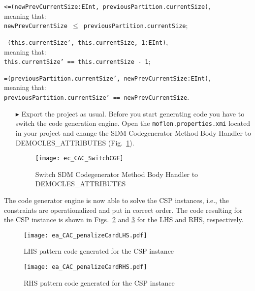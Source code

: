 \hspace*{0.5cm}\texttt{\small<=(newPrevCurrentSize:EInt, previousPartition.currentSize)},\\
meaning that:\\
\hspace*{0.5cm} \texttt{\small newPrevCurrentSize $\leq$ previousPartition.currentSize};

\hspace*{0.5cm}\texttt{\small-(this.currentSize', this.currentSize, 1:EInt)},\\
meaning that:\\
\hspace*{0.5cm} \texttt{\small this.currentSize' == this.currentSize - 1};

\hspace*{0.5cm}\texttt{\small=(previousPartition.currentSize', newPrevCurrentSize:EInt)},\\
meaning that:\\
\hspace*{0.5cm} \texttt{\small previousPartition.currentSize' == newPrevCurrentSize}.
\begin{itemize}    
\item[$\blacktriangleright$] Export the project as usual. Before you start generating code you have to switch the code generation engine. Open the \texttt{moflon.properties.xmi} located in your project and change the \textsf{SDM Codegenerator Method Body Handler} to  \textsf{DEMOCLES\_ATTRIBUTES} (Fig.~\ref{ec_CAC_SwitchCGE}).

\begin{figure}[htbp]
\begin{center}
  \texttt{[image: ec\_CAC\_SwitchCGE]}
  \caption{Switch \textsf{SDM Codegenerator Method Body Handler} to \textsf{DEMOCLES\_ATTRIBUTES}}  
  \label{ec_CAC_SwitchCGE}
\end{center}
\end{figure}

\end{itemize}
The code generator engine is now able to solve the CSP instances, i.e., the constraints are operationalized and put in correct order. 
The code resulting for the CSP instance is shown in Figs.~\ref{ea_CAC_penalizeCardLHS} and \ref{ea_CAC_penalizeCardRHS} for the LHS and RHS, respectively.
\begin{figure}[htbp]
\begin{center}
  \texttt{[image: ea\_CAC\_penalizeCardLHS.pdf]}
  \caption{LHS pattern code generated for the CSP instance}  
  \label{ea_CAC_penalizeCardLHS}
\end{center}
\end{figure}
\begin{figure}[htbp]
\begin{center}
  \texttt{[image: ea\_CAC\_penalizeCardRHS.pdf]}
  \caption{RHS pattern code generated for the CSP instance}  
  \label{ea_CAC_penalizeCardRHS}
\end{center}
\end{figure}

